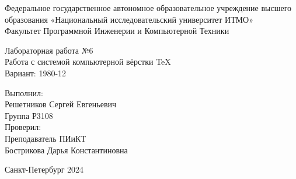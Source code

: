\begin{center}
    \large Федеральное государственное автономное образовательное учреждение высшего образования «Национальный исследовательский университет ИТМО»\\
    Факультет Программной Инженерии и Компьютерной Техники\\
    \hfill 
    
    
    \vspace{5.5cm}
    \Large Лабораторная работа №6 \\
    Работа с системой компьютерной вёрстки \TeX \\
    Вариант: 1980-12\\
    \end{center}
    
    \vspace{2.5cm}
     
    \begin{flushright}
        Выполнил:\\
        Решетников Сергей Евгеньевич\\
        Группа Р3108\\
    
        Проверил:\\
        Преподаватель ПИиКТ\\
        Бострикова Дарья Константиновна\\
    \end{flushright}
     
    \vfill
    
    \begin{center}
        Санкт-Петербург 2024
    \end{center}
\newpage